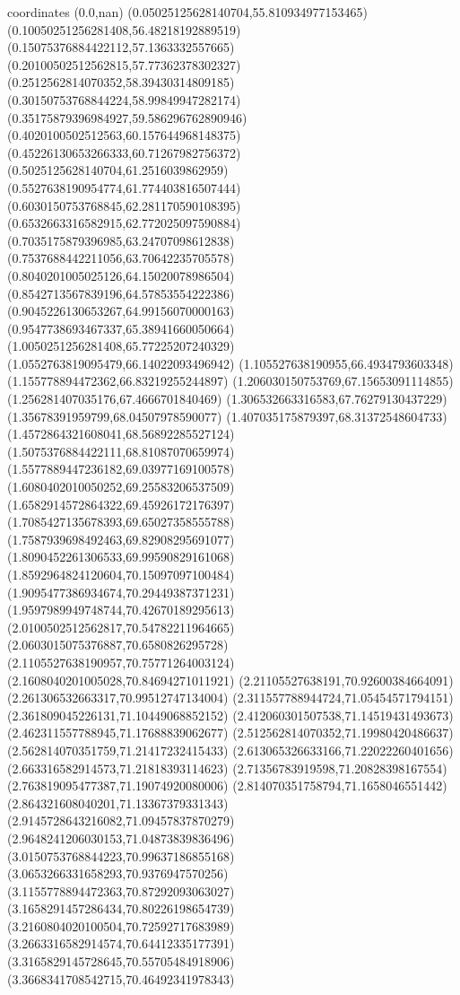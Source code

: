 coordinates {%
(0.0,nan)
(0.05025125628140704,55.810934977153465)
(0.10050251256281408,56.48218192889519)
(0.15075376884422112,57.1363332557665)
(0.20100502512562815,57.77362378302327)
(0.2512562814070352,58.39430314809185)
(0.30150753768844224,58.99849947282174)
(0.35175879396984927,59.586296762890946)
(0.4020100502512563,60.157644968148375)
(0.45226130653266333,60.71267982756372)
(0.5025125628140704,61.2516039862959)
(0.5527638190954774,61.774403816507444)
(0.6030150753768845,62.281170590108395)
(0.6532663316582915,62.772025097590884)
(0.7035175879396985,63.24707098612838)
(0.7537688442211056,63.70642235705578)
(0.8040201005025126,64.15020078986504)
(0.8542713567839196,64.57853554222386)
(0.9045226130653267,64.99156070000163)
(0.9547738693467337,65.38941660050664)
(1.0050251256281408,65.77225207240329)
(1.0552763819095479,66.14022093496942)
(1.105527638190955,66.4934793603348)
(1.155778894472362,66.83219255244897)
(1.206030150753769,67.15653091114855)
(1.256281407035176,67.4666701840469)
(1.306532663316583,67.76279130437229)
(1.35678391959799,68.04507978590077)
(1.407035175879397,68.31372548604733)
(1.4572864321608041,68.56892285527124)
(1.5075376884422111,68.81087070659974)
(1.5577889447236182,69.03977169100578)
(1.6080402010050252,69.25583206537509)
(1.6582914572864322,69.45926172176397)
(1.7085427135678393,69.65027358555788)
(1.7587939698492463,69.82908295691077)
(1.8090452261306533,69.99590829161068)
(1.8592964824120604,70.15097097100484)
(1.9095477386934674,70.29449387371231)
(1.9597989949748744,70.42670189295613)
(2.0100502512562817,70.54782211964665)
(2.0603015075376887,70.6580826295728)
(2.1105527638190957,70.75771264003124)
(2.1608040201005028,70.84694271011921)
(2.21105527638191,70.92600384664091)
(2.261306532663317,70.99512747134004)
(2.311557788944724,71.05454571794151)
(2.361809045226131,71.10449068852152)
(2.412060301507538,71.14519431493673)
(2.462311557788945,71.17688839062677)
(2.512562814070352,71.19980420486637)
(2.562814070351759,71.21417232415433)
(2.613065326633166,71.22022260401656)
(2.663316582914573,71.21818393114623)
(2.71356783919598,71.20828398167554)
(2.763819095477387,71.19074920080006)
(2.814070351758794,71.1658046551442)
(2.864321608040201,71.13367379331343)
(2.9145728643216082,71.09457837870279)
(2.9648241206030153,71.04873839836496)
(3.0150753768844223,70.99637186855168)
(3.0653266331658293,70.9376947570256)
(3.1155778894472363,70.87292093063027)
(3.1658291457286434,70.80226198654739)
(3.2160804020100504,70.72592717683989)
(3.2663316582914574,70.64412335177391)
(3.3165829145728645,70.55705484918906)
(3.3668341708542715,70.46492341978343)
}
